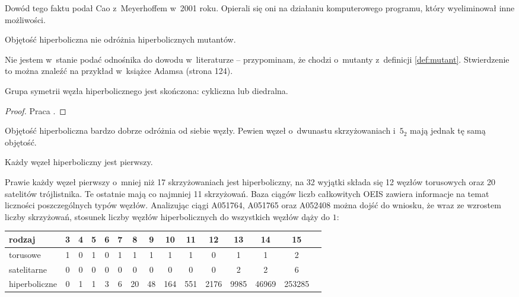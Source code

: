 Dowód tego faktu podał Cao z~Meyerhoffem w~2001 roku.
Opierali się oni na działaniu komputerowego programu, który wyeliminował inne możliwości.

\begin{proposition}
    Objętość hiperboliczna nie odróżnia hiperbolicznych mutantów.
\end{proposition}

Nie jestem w~stanie podać odnośnika do dowodu w~literaturze -- przypominam, że chodzi o~mutanty z~definicji \ref{def:mutant}.
Stwierdzenie to można znaleźć na przykład w~książce Adamsa (strona 124).

\begin{proposition}
    Grupa symetrii węzła hiperbolicznego jest skończona: cykliczna lub diedralna.
\end{proposition}

\begin{proof}
    Praca \cite{kodama92}.
\end{proof}

Objętość hiperboliczna bardzo dobrze odróżnia od siebie węzły.
Pewien węzeł o~dwunastu skrzyżowaniach i~$5_2$ mają jednak tę samą objętość.

\begin{proposition}
    Każdy węzeł hiperboliczny jest pierwszy.
\end{proposition}

Prawie każdy węzeł pierwszy o~mniej niż 17 skrzyżowaniach jest hiperboliczny, na 32 wyjątki składa się 12 węzłów torusowych oraz 20 satelitów trójlistnika.
Te ostatnie mają co najmniej 11 skrzyżowań.
Baza ciągów liczb całkowitych OEIS zawiera informacje na temat liczności poszczególnych typów węzłów.
Analizując ciągi A051764, A051765 oraz A052408 można dojść do wniosku, że wraz ze wzrostem liczby skrzyżowań, stosunek liczby węzłów hiperbolicznych do wszystkich węzłów dąży do $1$:

\renewcommand*{\arraystretch}{1.4}
\footnotesize
\begin{longtable}{lcccccccccccccc}
\hline
    \textbf{rodzaj} & 3 & 4 & 5 & 6 & 7 & 8  & 9  & 10  & 11  & 12   & 13   & 14    & 15     \\ \hline \endhead
    torusowe        & 1 & 0 & 1 & 0 & 1 & 1  & 1  & 1   & 1   & 0    & 1    & 1     & 2      \\
    satelitarne     & 0 & 0 & 0 & 0 & 0 & 0  & 0  & 0   & 0   & 0    & 2    & 2     & 6      \\
    hiperboliczne   & 0 & 1 & 1 & 3 & 6 & 20 & 48 & 164 & 551 & 2176 & 9985 & 46969 & 253285 \\
    \hline
\end{longtable}
\normalsize

